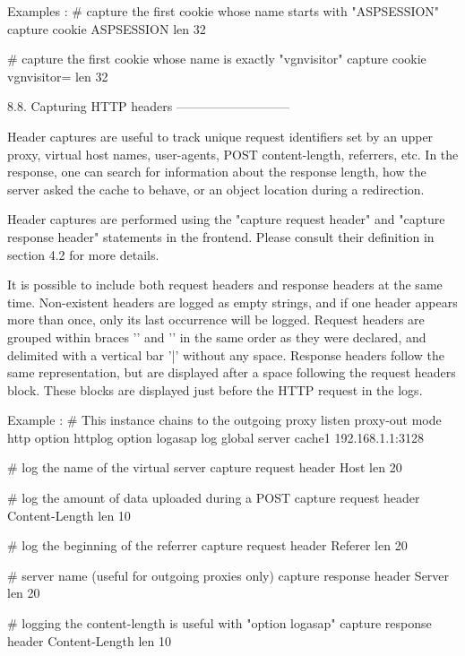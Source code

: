   Examples :
        # capture the first cookie whose name starts with "ASPSESSION"
        capture cookie ASPSESSION len 32

        # capture the first cookie whose name is exactly "vgnvisitor"
        capture cookie vgnvisitor= len 32


8.8. Capturing HTTP headers
---------------------------

Header captures are useful to track unique request identifiers set by an upper
proxy, virtual host names, user-agents, POST content-length, referrers, etc. In
the response, one can search for information about the response length, how the
server asked the cache to behave, or an object location during a redirection.

Header captures are performed using the "capture request header" and "capture
response header" statements in the frontend. Please consult their definition in
section 4.2 for more details.

It is possible to include both request headers and response headers at the same
time. Non-existent headers are logged as empty strings, and if one header
appears more than once, only its last occurrence will be logged. Request headers
are grouped within braces '{' and '}' in the same order as they were declared,
and delimited with a vertical bar '|' without any space. Response headers
follow the same representation, but are displayed after a space following the
request headers block. These blocks are displayed just before the HTTP request
in the logs.

  Example :
        # This instance chains to the outgoing proxy
        listen proxy-out
            mode http
            option httplog
            option logasap
            log global
            server cache1 192.168.1.1:3128

            # log the name of the virtual server
            capture request  header Host len 20

            # log the amount of data uploaded during a POST
            capture request  header Content-Length len 10

            # log the beginning of the referrer
            capture request  header Referer len 20

            # server name (useful for outgoing proxies only)
            capture response header Server len 20

            # logging the content-length is useful with "option logasap"
            capture response header Content-Length len 10

